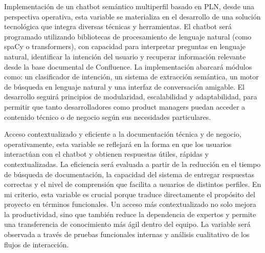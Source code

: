 Implementación de un chatbot semántico multiperfil basado en PLN, desde una perspectiva operativa, esta variable se materializa en el desarrollo de una solución tecnológica que integra diversas técnicas y herramientas. El chatbot será programado utilizando bibliotecas de procesamiento de lenguaje natural (como spaCy o transformers), con capacidad para interpretar preguntas en lenguaje natural, identificar la intención del usuario y recuperar información relevante desde la base documental de Confluence.
La implementación abarcará módulos como: un clasificador de intención, un sistema de extracción semántica, un motor de búsqueda en lenguaje natural y una interfaz de conversación amigable. El desarrollo seguirá principios de modularidad, escalabilidad y adaptabilidad, para permitir que tanto desarrolladores como product managers puedan acceder a contenido técnico o de negocio según sus necesidades particulares.

Acceso contextualizado y eficiente a la documentación técnica y de negocio, operativamente, esta variable se reflejará en la forma en que los usuarios interactúan con el chatbot y obtienen respuestas útiles, rápidas y contextualizadas. La eficiencia será evaluada a partir de la reducción en el tiempo de búsqueda de documentación, la capacidad del sistema de entregar respuestas correctas y el nivel de comprensión que facilita a usuarios de distintos perfiles.
En mi criterio, esta variable es crucial porque traduce directamente el propósito del proyecto en términos funcionales. Un acceso más contextualizado no solo mejora la productividad, sino que también reduce la dependencia de expertos y permite una transferencia de conocimiento más ágil dentro del equipo. La variable será observada a través de pruebas funcionales internas y análisis cualitativo de los flujos de interacción.

